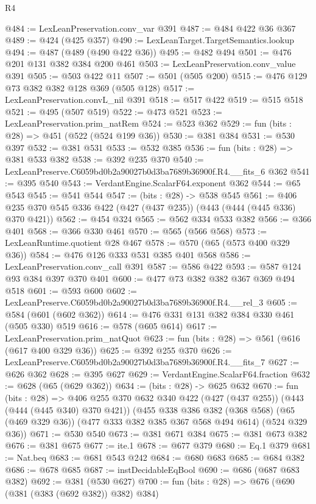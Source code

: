 \begin{lexlean}{R4}
\begin{coremodule}
@484 := LexLeanPreservation.conv_var @391
@487 := @484 @422 @36 @367
@489 := @424 (@425 @357)
@490 := LexLeanTarget.TargetSemantics.lookup
@494 := @487 (@489 (@490 @422 @36))
@495 := @482 @494
@501 := @476 @201 @131 @382 @384 @200 @461
@503 := LexLeanPreservation.conv_value @391
@505 := @503 @422 @11
@507 := @501 (@505 @200)
@515 := @476 @129 @73 @382 @382 @128 @369 (@505 @128)
@517 := LexLeanPreservation.convL_nil @391
@518 := @517 @422
@519 := @515 @518
@521 := @495 (@507 @519)
@522 := @473 @521
@523 := LexLeanPreservation.prim_natRem
@524 := @523 @362
@529 := fun (bits : @28) => @451 (@522 (@524 @199 @36))
@530 := @381 @384
@531 := @530 @397
@532 := @381 @531
@533 := @532 @385
@536 := fun (bits : @28) => @381 @533 @382
@538 := @392 @235 @370
@540 := LexLeanPreserve.C6059bd0b2a90027b0d3ba7689b36900f.R4.__fits_6 @362
@541 := @395 @540
@543 := VerdantEngine.ScalarF64.exponent @362
@544 := @65 @543
@545 := @541 @544
@547 := (bits : @28) -> @538 @545
@561 := @406 @235 @370 @545 @336 @422 (@427 (@437 @235)) (@443 (@444 (@445 @336) @370 @421))
@562 := @454 @324
@565 := @562 @334 @533 @382
@566 := @366 @401
@568 := @366 @330 @461
@570 := @565 (@566 @568)
@573 := LexLeanRuntime.quotient @28 @467
@578 := @570 (@65 (@573 @400 @329 @36))
@584 := @476 @126 @333 @531 @385 @401 @568
@586 := LexLeanPreservation.conv_call @391
@587 := @586 @422
@593 := @587 @124 @93 @384 @397 @370 @401
@600 := @477 @73 @382 @382 @367 @369 @494 @518
@601 := @593 @600
@602 := LexLeanPreserve.C6059bd0b2a90027b0d3ba7689b36900f.R4.__rel_3
@605 := @584 (@601 (@602 @362))
@614 := @476 @331 @131 @382 @384 @330 @461 (@505 @330) @519
@616 := @578 (@605 @614)
@617 := LexLeanPreservation.prim_natQuot
@623 := fun (bits : @28) => @561 (@616 (@617 @400 @329 @36))
@625 := @392 @255 @370
@626 := LexLeanPreserve.C6059bd0b2a90027b0d3ba7689b36900f.R4.__fits_7
@627 := @626 @362
@628 := @395 @627
@629 := VerdantEngine.ScalarF64.fraction
@632 := @628 (@65 (@629 @362))
@634 := (bits : @28) -> @625 @632
@670 := fun (bits : @28) =>
  @406
    @255
    @370
    @632
    @340
    @422
    (@427 (@437 @255))
    (@443 (@444 (@445 @340) @370 @421))
    (@455
      @338
      @386
      @382
      (@368 @568)
      (@65 (@469 @329 @36))
      (@477 @333 @382 @385 @367 @568 @494 @614)
      (@524 @329 @36))
@671 := @530 @540
@673 := @381 @671 @384
@675 := @381 @673 @382
@676 := @381 @675
@677 := ite.{1}
@678 := @677 @379
@680 := Eq.{1} @379
@681 := Nat.beq
@683 := @681 @543 @242
@684 := @680 @683
@685 := @684 @382
@686 := @678 @685
@687 := instDecidableEqBool
@690 := @686 (@687 @683 @382)
@692 := @381 (@530 @627)
@700 := fun (bits : @28) => @676 (@690 (@381 (@383 (@692 @382)) @382) @384)

\end{coremodule}
\end{lexlean}
